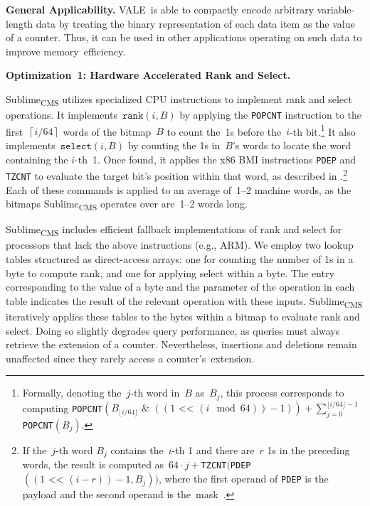 \documentclass[sigconf]{acmart}
\newcommand{\sketch}{Sublime}
\newcommand{\sketchcms}{\sketch\textsubscript{CMS}\xspace}
\newcommand{\counterencodingabbrv}{VALE}
\begin{document}
\textbf{General Applicability.}
\counterencodingabbrv\ is able to compactly encode arbitrary variable-length data by treating the binary representation of each data item as the value of a counter.
Thus, it can be used in other applications operating on such data to improve memory~efficiency.

\hypertarget{optimization:rank_and_select}{\textbf{Optimization~1: Hardware Accelerated Rank and Select.}}
\sketchcms utilizes specialized CPU instructions to implement rank and select operations.
It implements~$\texttt{rank}(i,B)$ by applying the \texttt{POPCNT} instruction to the first~$\left\lceil i/64 \right\rceil$ words of the bitmap~$B$ to count the~1s before the~$i${\nobreakdash-}th bit.\footnote{Formally, denoting the~$j${\nobreakdash-}th word in~$B$ as~$B_j$, this process corresponds to computing \texttt{POPCNT}$ \left(B_{\lfloor i/64 \rfloor}\text{~\&~}((1 \text{ <‌< } (i \mod 64))-1) \right) + \sum_{j=0}^{\lfloor i/64 \rfloor -1}$ \texttt{POPCNT}$(B_j)$.}
It also implements~$\texttt{select}(i,B)$ by counting the 1s in~$B$'s words to locate the word containing the $i${\nobreakdash-}th~1.
Once found, it applies the x86 BMI instructions \texttt{PDEP} and \texttt{TZCNT} to evaluate the target bit's position within that word, as described in \cite{GQF}.\footnote{If the~$j${\nobreakdash-}th word $B_j$ contains the~$i${\nobreakdash-}th 1 and there are~$r$ 1s in the preceding words, the result is computed as~$64 \cdot j + $\texttt{TZCNT}$($\texttt{PDEP}$((1 \text{ <‌< } (i-r)) - 1, B_j))$, where the first operand of \texttt{PDEP} is the payload and the second operand is the~mask~\cite{PDEP}.}
Each of these commands is applied to an average of~1--2 machine words, as the bitmaps \sketchcms operates over are~1--2 words long.

\sketchcms includes efficient fallback implementations of rank and select for
processors that lack the above instructions (e.g., ARM). We employ two lookup
tables structured as direct-access arrays: one for counting the number of 1s in
a byte to compute rank, and one for applying select within a byte. The entry
corresponding to the value of a byte and the parameter of the operation in each
table indicates the result of the relevant operation with these inputs.
\sketchcms iteratively applies these tables to the bytes within a bitmap to
evaluate rank and select. Doing so slightly degrades query performance, as
queries must always retrieve the extension of a counter. Nevertheless,
insertions and deletions remain unaffected since they rarely access a
counter's~extension.
\end{document}
